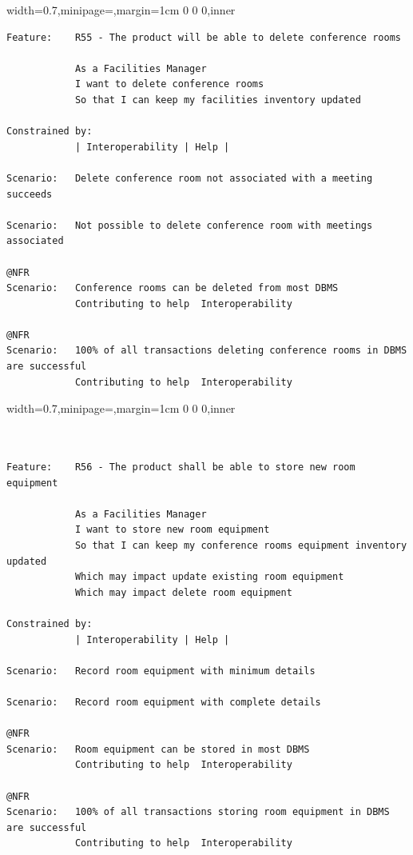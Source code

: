 \documentclass[dissertation,final]{softeng}
\newenvironment{featurecode}[1]
{ \lrbox\featurebox \begin{adjustbox}{width=#1\textwidth,minipage=\textwidth,margin=1cm 0 0 0,inner} }
{ \end{adjustbox}\endlrbox}
\newenvironment{featurelist}[2]
{
\newcommand{\setcaption}{\caption{#1}}
\newcommand{\setlabel}{\label{#2}}
}
{\begin{listing}[h!]\centering\usebox\featurebox\setcaption\setlabel\end{listing}}
\begin{document}
\begin{appendices}
\begin{featurelist}{R55 -- The product will be able to delete conference rooms}{lst:feature_r55}
\begin{featurecode}{0.7}
\begin{verbatim}
Feature:    R55 - The product will be able to delete conference rooms

            As a Facilities Manager
            I want to delete conference rooms
            So that I can keep my facilities inventory updated
		
Constrained by:
            | Interoperability | Help |

Scenario:   Delete conference room not associated with a meeting succeeds

Scenario:   Not possible to delete conference room with meetings associated

@NFR	
Scenario:   Conference rooms can be deleted from most DBMS
            Contributing to help  Interoperability

@NFR
Scenario:   100% of all transactions deleting conference rooms in DBMS are successful
            Contributing to help  Interoperability
\end{verbatim}
\end{featurecode}
\end{featurelist}

\begin{featurelist}{R56 -- The product shall be able to store new room equipment}{lst:feature_r56}
\begin{featurecode}{0.7}
\begin{verbatim}


Feature:    R56 - The product shall be able to store new room equipment

            As a Facilities Manager
            I want to store new room equipment
            So that I can keep my conference rooms equipment inventory updated
            Which may impact update existing room equipment
            Which may impact delete room equipment
			
Constrained by:
            | Interoperability | Help |

Scenario:   Record room equipment with minimum details

Scenario:   Record room equipment with complete details

@NFR
Scenario:   Room equipment can be stored in most DBMS
            Contributing to help  Interoperability

@NFR
Scenario:   100% of all transactions storing room equipment in DBMS are successful
            Contributing to help  Interoperability
\end{verbatim}
\end{featurecode}
\end{featurelist}
\clearpage


\end{appendices}
\end{document}
